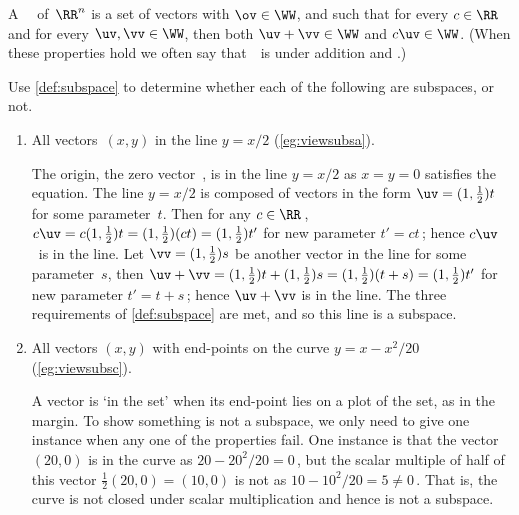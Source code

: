 \begin{definition} \label{def:subspace} 
A ~\WW\ of~\(\RR^n\) is a set of vectors with \(\ov\in\WW\), and such that for every \(c\in\RR\) and for every \(\uv,\vv\in\WW\), then both \(\uv+\vv\in\WW\) and \(c\uv\in\WW\). 
(When these properties hold we often say that~\WW\ is  under addition and .) 
\end{definition}


\begin{example} \label{eg:somsubs}
Use \cref{def:subspace} to determine whether each of the following are subspaces, or not. 
\begin{enumerate}[ref=\ref{eg:somsubs}(\alph*)]
\item All vectors~\((x,y)\) in the line \(y=x/2\) (\cref{eg:viewsubsa}).
\begin{solution} 
The origin, the zero vector~\ov, is in the line \(y=x/2\) as \(x=y=0\) satisfies the equation.
%
The line \(y=x/2\) is composed of vectors in the form \(\uv=(1,\frac12)t\) for some parameter~\(t\).
Then for any \(c\in\RR\)\,, \(c\uv=c(1,\frac12)t=(1,\frac12)(ct)=(1,\frac12)t'\) for new parameter \(t'=ct\)\,; hence \(c\uv\)~is in the line.
Let \(\vv=(1,\frac12)s\) be another vector in the line for some parameter~\(s\), then \(\uv+\vv=(1,\frac12)t+(1,\frac12)s=(1,\frac12)(t+s)=(1,\frac12)t'\) for new parameter \(t'=t+s\)\,; hence \(\uv+\vv\) is in the line.
The three requirements of \cref{def:subspace} are met, and so this line is a subspace. 
\end{solution}

\item All vectors \((x,y)\) with end-points on the curve \(y=x-x^2/20\) (\cref{eg:viewsubsc}).
\begin{solution} 
A vector is `in the set' when its end-point lies on a plot of the set, as in the margin.
%
To show something is not a subspace, we only need to give one instance when any one of the properties fail.
One instance is that the vector \((20,0)\) is in the curve as \(20-20^2/20=0\)\,, but the scalar multiple of half of this vector \(\frac12(20,0)=(10,0)\) is not as \(10-10^2/20=5\neq0\)\,.
That is, the curve is not closed under scalar multiplication and hence is not a subspace. 
\end{solution}


\end{enumerate}
\end{example}
